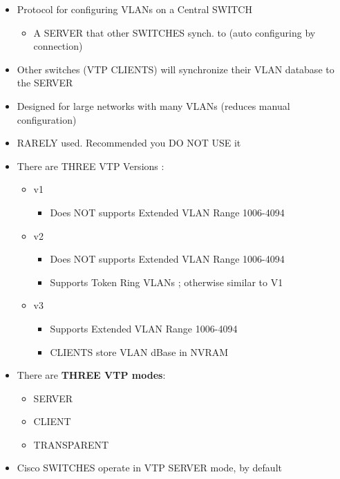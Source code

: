 \begin{itemize}
\item
  Protocol for configuring VLANs on a Central SWITCH

  \begin{itemize}
  \tightlist
  \item
    A SERVER that other SWITCHES synch. to (auto configuring by
    connection)
  \end{itemize}
\item
  Other switches (VTP CLIENTS) will synchronize their VLAN database to
  the SERVER
\item
  Designed for large networks with many VLANs (reduces manual
  configuration)
\item
  RARELY used. Recommended you DO NOT USE it
\item
  There are THREE VTP Versions :

  \begin{itemize}
  \tightlist
  \item
    v1

    \begin{itemize}
    \tightlist
    \item
      Does NOT supports Extended VLAN Range 1006-4094
    \end{itemize}
  \item
    v2

    \begin{itemize}
    \tightlist
    \item
      Does NOT supports Extended VLAN Range 1006-4094
    \item
      Supports Token Ring VLANs ; otherwise similar to V1
    \end{itemize}
  \item
    v3

    \begin{itemize}
    \tightlist
    \item
      Supports Extended VLAN Range 1006-4094
    \item
      CLIENTS store VLAN dBase in NVRAM
    \end{itemize}
  \end{itemize}
\item
  There are \textbf{THREE VTP modes}:

  \begin{itemize}
  \tightlist
  \item
    SERVER
  \item
    CLIENT
  \item
    TRANSPARENT
  \end{itemize}
\item
  Cisco SWITCHES operate in VTP SERVER mode, by default
\end{itemize}

